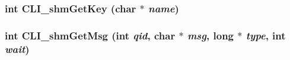 \subsubsection{\setlength{\rightskip}{0pt plus 5cm}int CLI\_\-shm\-Get\-Key (char $\ast$ {\em name})}\label{shm__client_2shmclientLib_8h_855c34dc8f8830583d0186d655072ccb}


\subsubsection{\setlength{\rightskip}{0pt plus 5cm}int CLI\_\-shm\-Get\-Msg (int {\em qid}, char $\ast$ {\em msg}, long $\ast$ {\em type}, int {\em wait})}\label{shm__client_2shmclientLib_8h_e9331b80bd3e7646c60c0c48bc8d8afc}



